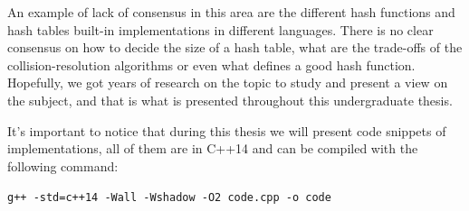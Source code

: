 An example of lack of consensus in this area are the different hash functions and hash tables built-in implementations in different languages. There is no clear consensus on how to decide the size of a hash table, what are the trade-offs of the collision-resolution algorithms or even what defines a good hash function. Hopefully, we got years of research on the topic to study and present a view on the subject, and that is what is presented throughout this undergraduate thesis.

It's important to notice that during this thesis we will present code snippets of implementations, all of them are in C++14 and can be compiled with the following command:

\begin{center}
  {\texttt{g++ -std=c++14 -Wall -Wshadow -O2 code.cpp -o code}}
\end{center}


